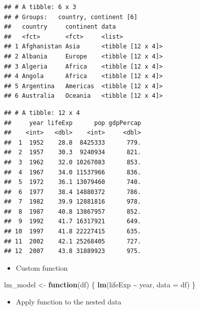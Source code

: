 \documentclass[
]{book}
\newenvironment{Shaded}{\begin{snugshade}}{\end{snugshade}}
\newcommand{\AttributeTok}[1]{\textcolor[rgb]{0.13,0.29,0.53}{#1}}
\newcommand{\ControlFlowTok}[1]{\textcolor[rgb]{0.13,0.29,0.53}{\textbf{#1}}}
\newcommand{\DecValTok}[1]{\textcolor[rgb]{0.00,0.00,0.81}{#1}}
\newcommand{\FunctionTok}[1]{\textcolor[rgb]{0.13,0.29,0.53}{\textbf{#1}}}
\newcommand{\NormalTok}[1]{#1}
\newcommand{\OtherTok}[1]{\textcolor[rgb]{0.56,0.35,0.01}{#1}}
\newcommand{\SpecialCharTok}[1]{\textcolor[rgb]{0.81,0.36,0.00}{\textbf{#1}}}
\providecommand{\tightlist}{%
  \setlength{\itemsep}{0pt}\setlength{\parskip}{0pt}}
\begin{document}
\begin{verbatim}
## # A tibble: 6 x 3
## # Groups:   country, continent [6]
##   country     continent data             
##   <fct>       <fct>     <list>           
## 1 Afghanistan Asia      <tibble [12 x 4]>
## 2 Albania     Europe    <tibble [12 x 4]>
## 3 Algeria     Africa    <tibble [12 x 4]>
## 4 Angola      Africa    <tibble [12 x 4]>
## 5 Argentina   Americas  <tibble [12 x 4]>
## 6 Australia   Oceania   <tibble [12 x 4]>
\end{verbatim}

\begin{Shaded}
\end{Shaded}

\begin{verbatim}
## # A tibble: 12 x 4
##     year lifeExp      pop gdpPercap
##    <int>   <dbl>    <int>     <dbl>
##  1  1952    28.8  8425333      779.
##  2  1957    30.3  9240934      821.
##  3  1962    32.0 10267083      853.
##  4  1967    34.0 11537966      836.
##  5  1972    36.1 13079460      740.
##  6  1977    38.4 14880372      786.
##  7  1982    39.9 12881816      978.
##  8  1987    40.8 13867957      852.
##  9  1992    41.7 16317921      649.
## 10  1997    41.8 22227415      635.
## 11  2002    42.1 25268405      727.
## 12  2007    43.8 31889923      975.
\end{verbatim}

\begin{itemize}
\tightlist
\item
  Custom function
\end{itemize}

\begin{Shaded}
\begin{Highlighting}[]
\NormalTok{lm\_model }\OtherTok{\textless{}{-}} \ControlFlowTok{function}\NormalTok{(df) \{}
  \FunctionTok{lm}\NormalTok{(lifeExp }\SpecialCharTok{\textasciitilde{}}\NormalTok{ year, }\AttributeTok{data =}\NormalTok{ df)}
\NormalTok{\}}
\end{Highlighting}
\end{Shaded}

\begin{itemize}
\tightlist
\item
  Apply function to the nested data
\end{itemize}
\end{document}

